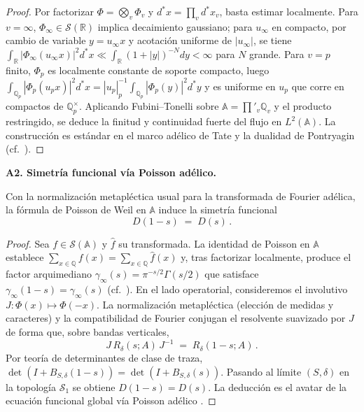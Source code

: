 \begin{proof}
Por factorizar $\Phi=\bigotimes_v \Phi_v$ y $d^\ast x=\prod_v d^\ast x_v$, basta estimar localmente.
Para $v=\infty$, $\Phi_\infty\in \mathcal{S}(\mathbb{R})$ implica decaimiento gaussiano; para $u_\infty$ en compacto,
por cambio de variable $y=u_\infty x$ y acotación uniforme de $|u_\infty|$, se tiene
$\int_\mathbb{R}|\Phi_\infty(u_\infty x)|^2 d^\ast x \ll \int_\mathbb{R} (1+|y|)^{-N}dy<\infty$ para $N$ grande.
Para $v=p$ finito, $\Phi_p$ es localmente constante de soporte compacto,
luego $\int_{\mathbb{Q}_p}|\Phi_p(u_p x)|^2 d^\ast x = |u_p|_p^{-1}\int_{\mathbb{Q}_p}|\Phi_p(y)|^2 d^\ast y$
y es uniforme en $u_p$ que corre en compactos de $\mathbb{Q}_p^\times$.
Aplicando Fubini–Tonelli sobre $\mathbb{A}=\prod'_v \mathbb{Q}_v$ y el producto restringido, se deduce la
finitud y continuidad fuerte del flujo en $L^2(\mathbb{A})$.
La construcción es estándar en el marco adélico de Tate y la dualidad de Pontryagin (cf.~\cite{tate1967,Weil1964}).
\end{proof}

\bigskip
\noindent\textbf{A2. Simetría funcional vía Poisson adélico.}

\begin{lemma}[A2: simetría $D(1-s)=D(s)$]\label{lem:A2}
Con la normalización metapléctica usual para la transformada de Fourier adélica,
la fórmula de Poisson de Weil en $\mathbb{A}$ induce la simetría funcional
\[
D(1-s)\;=\;D(s)\,.
\]
\end{lemma}

\begin{proof}
Sea $f\in \mathcal{S}(\mathbb{A})$ y $\widehat f$ su transformada. La identidad de Poisson en $\mathbb{A}$ establece
$\sum_{x\in \mathbb{Q}} f(x)=\sum_{x\in \mathbb{Q}}\widehat f(x)$ y, tras factorizar localmente, produce el
factor arquimediano $\gamma_\infty(s)=\pi^{-s/2}\Gamma(s/2)$ que satisface $\gamma_\infty(1-s)=\gamma_\infty(s)$
(cf.~\cite{Weil1964}).
En el lado operatorial, consideremos el involutivo $J: \Phi(x)\mapsto \Phi(-x)$.
La normalización metapléctica (elección de medidas y caracteres) y la compatibilidad de Fourier
conjugan el resolvente suavizado por $J$ de forma que, sobre bandas verticales,
\[
J\,R_\delta(s;A)\,J^{-1} \;=\; R_\delta(1-s;A)\,.
\]
Por teoría de determinantes de clase de traza, $\det(I+B_{S,\delta}(1-s))=\det(I+B_{S,\delta}(s))$.
Pasando al límite $(S,\delta)$ en la topología $\mathcal S_1$ se obtiene $D(1-s)=D(s)$.
La deducción es el avatar de la ecuación funcional global vía Poisson adélico \cite{tate1967,Weil1964}.
\end{proof}

